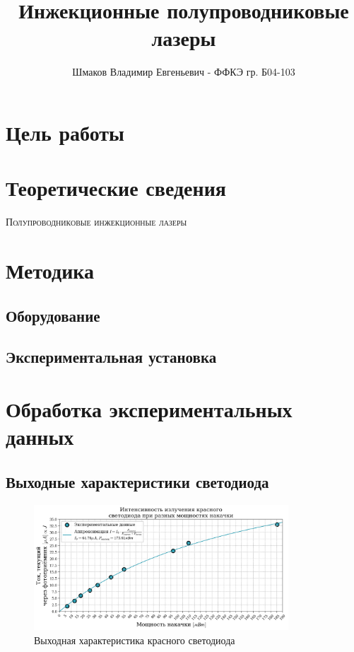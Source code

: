 \documentclass[a4paper, 12pt]{extarticle}
\title{\textcolor{main_title}{Инжекционные полупроводниковые лазеры}}
\author{Шмаков Владимир Евгеньевич - ФФКЭ гр. Б04-103}
\begin{document}
\maketitle



\section*{\textcolor{header}{Цель работы}}
\section*{\textcolor{header}{Теоретические сведения}}

\lettrine{\textcolor{defenition}{П}}{\textcolor{defenition}{олупроводниковые инжекционные лазеры}} 




\section*{\textcolor{header}{Методика}}

\subsection*{\textcolor{sub_header}{Оборудование}}


\subsection*{\textcolor{sub_header}{Экспериментальная установка}}

\section*{\textcolor{header}{Обработка экспериментальных данных}}
\subsection*{\textcolor{sub_header}{Выходные характеристики светодиода}}

\begin{figure}[htbp]
    \centering
    \includegraphics[width = 0.85\textwidth]{red_vc.png}
    \caption{Выходная характеристика красного светодиода}
    \label{fig:red_vc}
\end{figure}
\end{document}
